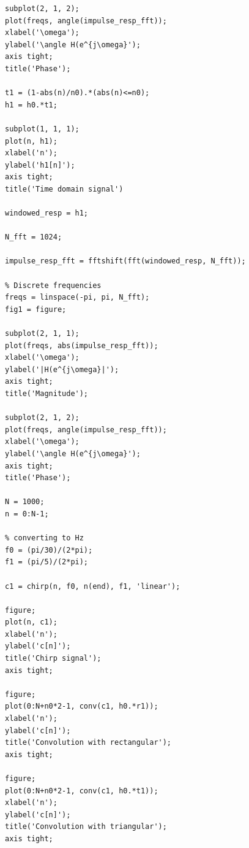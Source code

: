 \documentclass[12pt]{article}
\begin{document}
\begin{enumerate}[label=\textbf{\alph*)}, leftmargin=2.6em]
\begin{verbatim}
subplot(2, 1, 2);
plot(freqs, angle(impulse_resp_fft));
xlabel('\omega');
ylabel('\angle H(e^{j\omega}');
axis tight;
title('Phase');

t1 = (1-abs(n)/n0).*(abs(n)<=n0);
h1 = h0.*t1;

subplot(1, 1, 1);
plot(n, h1);
xlabel('n');
ylabel('h1[n]');
axis tight;
title('Time domain signal')

windowed_resp = h1;

N_fft = 1024;

impulse_resp_fft = fftshift(fft(windowed_resp, N_fft));

% Discrete frequencies
freqs = linspace(-pi, pi, N_fft);
fig1 = figure;

subplot(2, 1, 1);
plot(freqs, abs(impulse_resp_fft));
xlabel('\omega');
ylabel('|H(e^{j\omega}|');
axis tight;
title('Magnitude');

subplot(2, 1, 2);
plot(freqs, angle(impulse_resp_fft));
xlabel('\omega');
ylabel('\angle H(e^{j\omega}');
axis tight;
title('Phase');

N = 1000;
n = 0:N-1;

% converting to Hz
f0 = (pi/30)/(2*pi);
f1 = (pi/5)/(2*pi);

c1 = chirp(n, f0, n(end), f1, 'linear');

figure;
plot(n, c1);
xlabel('n');
ylabel('c[n]');
title('Chirp signal');
axis tight;

figure;
plot(0:N+n0*2-1, conv(c1, h0.*r1));
xlabel('n');
ylabel('c[n]');
title('Convolution with rectangular');
axis tight;

figure;
plot(0:N+n0*2-1, conv(c1, h0.*t1));
xlabel('n');
ylabel('c[n]');
title('Convolution with triangular');
axis tight;
\end{verbatim}

\end{enumerate}
\end{document}
